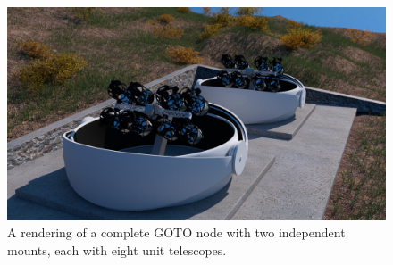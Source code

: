 \begin{colsection}
\begin{figure}[p]
    \begin{center}
        \includegraphics[width=0.9\linewidth]{images/goto_render.png}
    \end{center}
    \caption[A rendering of a complete GOTO node]{
        A rendering of a complete GOTO node with two independent mounts, each with eight unit telescopes.
    }\label{fig:goto_render}
\end{figure}

\end{colsection}


